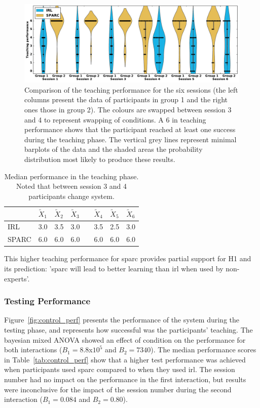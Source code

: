 \begin{figure}[ht]
	\includegraphics[width=\textwidth]{teaching_performance.pdf}
	\centering
	\caption{Comparison of the teaching performance for the six sessions (the left columns present the data of participants in group 1 and the right ones those in group 2). The colours are swapped between session 3 and 4 to represent swapping of conditions. A 6 in teaching performance shows that the participant reached at least one success during the teaching phase. The vertical grey lines represent minimal barplots of the data and the shaded areas the probability distribution most likely to produce these results.
	}
	\label{fig:control_teaching_performance}
\end{figure}

\begin{table}[ht]
	\centering
	\caption{Median performance in the teaching phase. Noted that between session 3 and 4 participants change system.}
	\label{tab:control_teaching_perf}
	\begin{tabular}{@{}llllllll@{}}\toprule
		& $\widetilde{X}_{1}$ & $\widetilde{X}_{2}$ & $\widetilde{X}_{3}$& & $\widetilde{X}_{4}$ & $\widetilde{X}_{5}$ & $\widetilde{X}_{6}$\\ 
		\midrule
		IRL & 3.0 & 3.5 & 3.0 & \crossarr & 3.5 & 2.5 & 3.0\\
		SPARC & 6.0 & 6.0 & 6.0 && 6.0 & 6.0 & 6.0\\
		\bottomrule
	\end{tabular}
\end{table}

This higher teaching performance for \gls{sparc} provides partial support for H1 and its prediction: '\gls{sparc} will lead to better learning
than \gls{irl} when used by non-experts'.

\subsubsection{Testing Performance}

Figure~\ref{fig:control_perf} presents the performance of the system during the testing phase, and represents how successful was the participants' teaching. The bayesian mixed ANOVA showed an effect of condition on the performance for both interactions ($B_1=8.8$x$10^5$ and $B_2 = 7340$). The median performance scores in Table~\ref{tab:control_perf} show that a higher test performance was achieved when participants used \gls{sparc} compared to when they used \gls{irl}. The session number had no impact on the performance in the first interaction, but results were inconclusive for the impact of the session number during the second interaction ($B_1=0.084$ and $B_2=0.80$).

